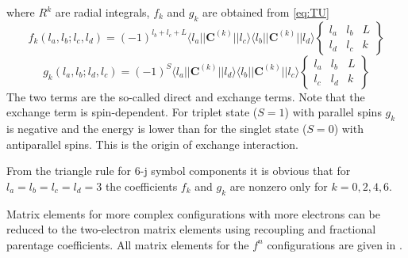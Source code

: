 \documentclass[a4paper,oneside,12pt]{extarticle}
\begin{document}
%
where $R^k$ are radial integrals, $f_k$ and $g_k$ are obtained from \ref{eq:TU}
$$
f_k(l_a, l_b; l_c, l_d) = (-1)^{l_{b}+l_{c}+L} \langle l_a || \mathbf{C}^{(k)} || l_c \rangle
\langle l_b || \mathbf{C}^{(k)} || l_d \rangle
\left \{
\begin{array}{ccc}
l_a & l_b & L \\
l_d & l_c & k
\end{array}
\right \}
$$
%
$$
g_k(l_a, l_b; l_d, l_c) = (-1)^{S} \langle l_a || \mathbf{C}^{(k)} || l_d \rangle
\langle l_b || \mathbf{C}^{(k)} || l_c \rangle
\left \{
\begin{array}{ccc}
l_a & l_b & L \\
l_c & l_d & k
\end{array}
\right \}
$$
The two terms are the so-called direct and exchange terms. Note that the exchange term is spin-dependent. For triplet state ($S=1$) with parallel spins $g_k$ is negative and the energy is lower than for the singlet state ($S=0$) with antiparallel spins. This is the origin of exchange interaction.

From the triangle rule for 6-j symbol components it is obvious that for $l_a=l_b=l_c=l_d=3$ the coefficients $f_k$ and $g_k$ are nonzero only for $k=0,2,4,6$.

Matrix elements for more complex configurations with more electrons can be reduced to the two-electron matrix elements using recoupling and fractional parentage coefficients. All matrix elements for the $f^n$ configurations are given in \cite{NielsonKoster}.

\end{document}
